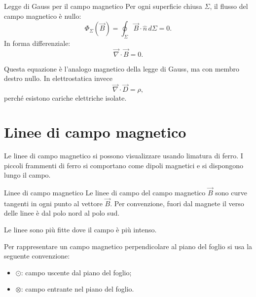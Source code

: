 \documentclass[a4paper]{article}
\begin{document}
\begin{snippettheorem}{Legge di Gauss per il campo magnetico}
    Per ogni superficie chiusa \(\Sigma\), il flusso del campo magnetico è nullo:
    \[
        \Phi_\Sigma(\vec{B})=\oint_\Sigma \vec{B}\cdot\hat{n}\,d\Sigma=0.
    \]
    In forma differenziale:
    \[
        \vec{\nabla}\cdot\vec{B}=0.
    \]
\end{snippettheorem}

Questa equazione è l'analogo magnetico della legge di Gauss, ma con membro destro nullo. In elettrostatica invece
\[
    \vec{\nabla}\cdot\vec{D}=\rho,
\]
perché esistono cariche elettriche isolate.

\section{Linee di campo magnetico}

Le linee di campo magnetico si possono visualizzare usando limatura di ferro. I piccoli frammenti di ferro si comportano come dipoli magnetici e si dispongono lungo il campo.

\begin{snippetdefinition}{Linee di campo magnetico}
    Le linee di campo del campo magnetico \(\vec{B}\) sono curve tangenti in ogni punto al vettore \(\vec{B}\). Per convenzione, fuori dal magnete il verso delle linee è dal polo nord al polo sud.
\end{snippetdefinition}

Le linee sono più fitte dove il campo è più intenso.

Per rappresentare un campo magnetico perpendicolare al piano del foglio si usa la seguente convenzione:
\begin{itemize}
    \item \(\odot\): campo uscente dal piano del foglio;
    \item \(\otimes\): campo entrante nel piano del foglio.
\end{itemize}

\begin{center}
\end{center}
\end{document}

